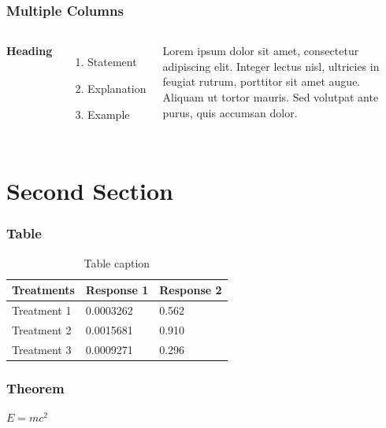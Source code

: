 \documentclass{beamer}
\begin{document}
\begin{frame}
\frametitle{Multiple Columns}
\begin{columns}[c] %

\textbf{Heading}
\begin{enumerate}
\item Statement
\item Explanation
\item Example
\end{enumerate}

Lorem ipsum dolor sit amet, consectetur adipiscing elit. Integer lectus nisl, ultricies in feugiat rutrum, porttitor sit amet augue. Aliquam ut tortor mauris. Sed volutpat ante purus, quis accumsan dolor.

\end{columns}
\end{frame}

\section{Second Section}

\begin{frame}
\frametitle{Table}
\begin{table}
\begin{tabular}{l l l}
\toprule
\textbf{Treatments} & \textbf{Response 1} & \textbf{Response 2}\\
\midrule
Treatment 1 & 0.0003262 & 0.562 \\
Treatment 2 & 0.0015681 & 0.910 \\
Treatment 3 & 0.0009271 & 0.296 \\
\bottomrule
\end{tabular}
\caption{Table caption}
\end{table}
\end{frame}


\begin{frame}
\frametitle{Theorem}
\begin{theorem}
$E = mc^2$
\end{theorem}
\end{frame}
\end{document}
